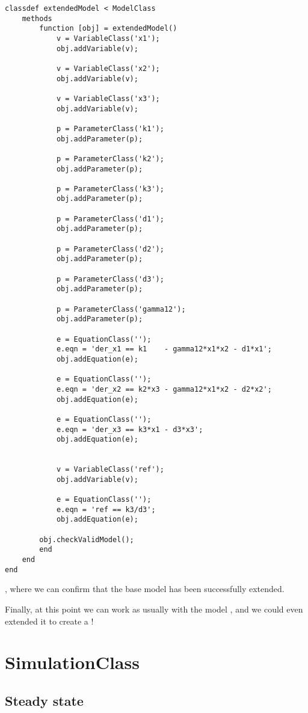 \documentclass[11pt]{article}
\begin{document}
\begin{lstlisting}
classdef extendedModel < ModelClass
	methods
		function [obj] = extendedModel()
			v = VariableClass('x1');
			obj.addVariable(v);

			v = VariableClass('x2');
			obj.addVariable(v);

			v = VariableClass('x3');
			obj.addVariable(v);

			p = ParameterClass('k1');
			obj.addParameter(p);

			p = ParameterClass('k2');
			obj.addParameter(p);

			p = ParameterClass('k3');
			obj.addParameter(p);

			p = ParameterClass('d1');
			obj.addParameter(p);

			p = ParameterClass('d2');
			obj.addParameter(p);

			p = ParameterClass('d3');
			obj.addParameter(p);

			p = ParameterClass('gamma12');
			obj.addParameter(p);

			e = EquationClass('');
			e.eqn = 'der_x1 == k1    - gamma12*x1*x2 - d1*x1';
			obj.addEquation(e);

			e = EquationClass('');
			e.eqn = 'der_x2 == k2*x3 - gamma12*x1*x2 - d2*x2';
			obj.addEquation(e);

			e = EquationClass('');
			e.eqn = 'der_x3 == k3*x1 - d3*x3';
			obj.addEquation(e);


			v = VariableClass('ref');
			obj.addVariable(v);

			e = EquationClass('');
			e.eqn = 'ref == k3/d3';
			obj.addEquation(e);

		obj.checkValidModel();
		end
	end
end
\end{lstlisting}

, where we can confirm that the base model has been successfully extended.

Finally, at this point we can work as usually with the model , and we could even extended it to create a !

\section{SimulationClass}

\subsection{Steady state}
\end{document}
